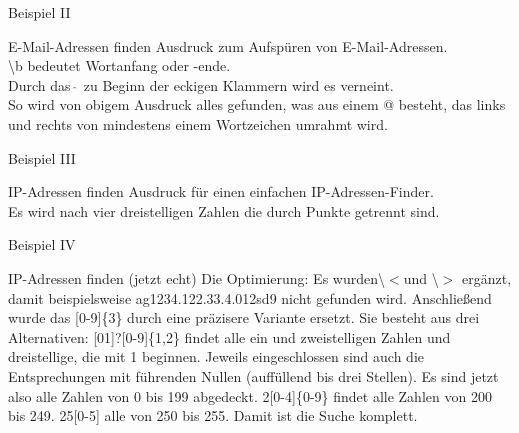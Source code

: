 \documentclass[aspectratio=43]{beamer}
\begin{document}
\begin{frame} 
	\begin{exampleblock}{Beispiel II}
	\end{exampleblock}

	\begin{block}{E­-Mail­-Adressen finden} 
Ausdruck zum Aufspüren von E­-Mail­-Adressen. \\
\textbackslash b bedeutet Wortanfang oder ­-ende. \\
Durch das $\hat{\;}$ zu Beginn der eckigen Klammern wird es verneint. 
\\So wird von obigem Ausdruck alles gefunden, was aus einem @ besteht, das links und rechts von mindestens einem Wortzeichen umrahmt wird. 
	\end{block}	
\end{frame}

\begin{frame} 
	\begin{exampleblock}{Beispiel III}
	\end{exampleblock}

	\begin{block}{IP­-Adressen finden} 
Ausdruck für einen einfachen IP-­Adressen-­Finder.\\
Es wird nach vier dreistelligen Zahlen die durch Punkte getrennt sind.
	\end{block}	
\end{frame}

\begin{frame} 
	\begin{exampleblock}{Beispiel IV}
	 \tiny{}
	\end{exampleblock}

	\begin{block}{IP­-Adressen finden (jetzt echt)} 
Die Optimierung: Es wurden\textbackslash$<$und \textbackslash$>$ ergänzt, damit beispielsweise ag1234.122.33.4.012sd9 nicht gefunden wird. Anschließend wurde das [0­-9]\{3\} durch eine präzisere Variante ersetzt. Sie besteht aus drei Alternativen: [01]?[0-­9]\{1,2\} findet alle ein­ und zweistelligen Zahlen und dreistellige, die mit 1 beginnen. Jeweils eingeschlossen sind auch die Entsprechungen mit führenden Nullen (auffüllend bis drei Stellen). Es sind jetzt also alle Zahlen von 0 bis 199 abgedeckt. 2[0­-4]\{0­-9\} findet alle Zahlen von 200 bis 249. 25[0-­5] alle von 250 bis 255. Damit ist die Suche komplett.
	\end{block}	
\end{frame}
\end{document}
